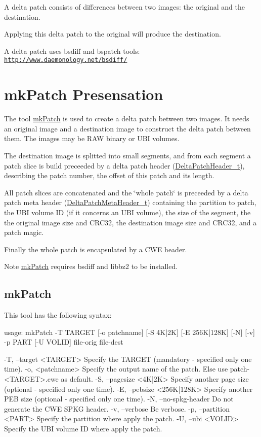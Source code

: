 A delta patch consists of differences between two images\+: the original and the destination.

Applying this delta patch to the original will produce the destination.

A delta patch uses bsdiff and bspatch tools\+: \href{http://www.daemonology.net/bsdiff/}{\tt http\+://www.\+daemonology.\+net/bsdiff/}\hypertarget{Delta_Patch_mkPatch_Presentation}{}\section{mk\+Patch Presensation}\label{Delta_Patch_mkPatch_Presentation}
The tool \hyperlink{Delta_Patch_mkPatch_tool}{mk\+Patch} is used to create a delta patch between two images. It needs an original image and a destination image to construct the delta patch between them. The images may be R\+AW binary or U\+BI volumes.

The destination image is splitted into small segments, and from each segment a patch slice is build preceeded by a delta patch header (\hyperlink{struct_delta_patch_header__t}{Delta\+Patch\+Header\+\_\+t}), describing the patch number, the offset of this patch and its length.

All patch slices are concatenated and the \char`\"{}whole patch\char`\"{} is preceeded by a delta patch meta header (\hyperlink{struct_delta_patch_meta_header__t}{Delta\+Patch\+Meta\+Header\+\_\+t}) containing the partition to patch, the U\+BI volume ID (if it concerns an U\+BI volume), the size of the segment, the the original image size and C\+R\+C32, the destination image size and C\+R\+C32, and a patch magic.

Finally the whole patch is encapsulated by a C\+WE header.

\begin{DoxyNote}{Note}
\hyperlink{Delta_Patch_mkPatch_tool}{mk\+Patch} requires bsdiff and libbz2 to be installed.
\end{DoxyNote}
\hypertarget{Delta_Patch_mkPatch_tool}{}\subsection{mk\+Patch}\label{Delta_Patch_mkPatch_tool}
This tool has the following syntax\+:

\begin{DoxyVerb}usage: mkPatch -T TARGET [-o patchname] [-S 4K|2K] [-E 256K|128K] [-N] [-v]
        {-p PART {[-U VOLID] file-orig file-dest}}

   -T, --target <TARGET>
        Specify the TARGET (mandatory - specified only one time).
   -o, <patchname>
        Specify the output name of the patch. Else use patch-<TARGET>.cwe as default.
   -S, --pagesize <4K|2K>
        Specify another page size (optional - specified only one time).
   -E, --pebsize <256K|128K>
        Specify another PEB size (optional - specified only one time).
   -N, --no-spkg-header
        Do not generate the CWE SPKG header.
   -v, --verbose
        Be verbose.
   -p, --partition <PART>
        Specify the partition where apply the patch.
   -U, --ubi <VOLID>
        Specify the UBI volume ID where apply the patch.
\end{DoxyVerb}


